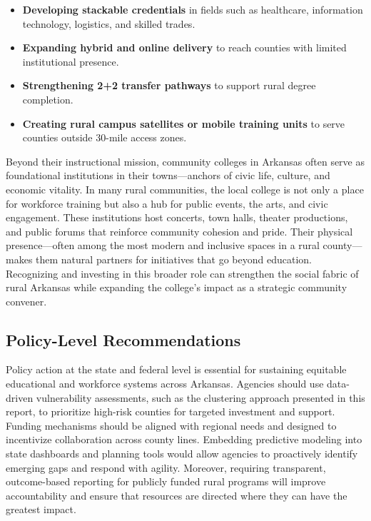 \documentclass{llncs}
\begin{document}
\begin{itemize}
    \item \textbf{Developing stackable credentials} in fields such as healthcare, information technology, logistics, and skilled trades.
    \item \textbf{Expanding hybrid and online delivery} to reach counties with limited institutional presence.
    \item \textbf{Strengthening 2+2 transfer pathways} to support rural degree completion.
    \item \textbf{Creating rural campus satellites or mobile training units} to serve counties outside 30-mile access zones.
\end{itemize}

Beyond their instructional mission, community colleges in Arkansas often serve as foundational institutions in their towns—anchors of civic life, culture, and economic vitality. In many rural communities, the local college is not only a place for workforce training but also a hub for public events, the arts, and civic engagement. These institutions host concerts, town halls, theater productions, and public forums that reinforce community cohesion and pride. Their physical presence—often among the most modern and inclusive spaces in a rural county—makes them natural partners for initiatives that go beyond education. Recognizing and investing in this broader role can strengthen the social fabric of rural Arkansas while expanding the college’s impact as a strategic community convener.

\subsection{Policy-Level Recommendations} \label{subsec:policy_recommendations}

Policy action at the state and federal level is essential for sustaining equitable educational and workforce systems across Arkansas. Agencies should use data-driven vulnerability assessments, such as the clustering approach presented in this report, to prioritize high-risk counties for targeted investment and support. Funding mechanisms should be aligned with regional needs and designed to incentivize collaboration across county lines. Embedding predictive modeling into state dashboards and planning tools would allow agencies to proactively identify emerging gaps and respond with agility. Moreover, requiring transparent, outcome-based reporting for publicly funded rural programs will improve accountability and ensure that resources are directed where they can have the greatest impact.
\end{document}
